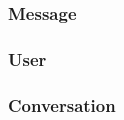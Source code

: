\documentclass[a4paper,11pt]{article}
\begin{document}
			\subsubsection{Message}
			
			\subsubsection{User}
			
			\subsubsection{Conversation}
			








	
\end{document}
